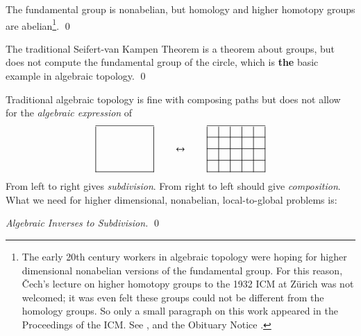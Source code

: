 \documentclass{elsarticle}
\begin{document}
\begin{anomaly}\label{thm:anom1} The fundamental group is nonabelian, but homology and higher homotopy groups are abelian\footnote{The early 20th century workers in algebraic topology were hoping for higher dimensional nonabelian versions of the fundamental group. For this reason,  \v Cech's lecture  on higher homotopy groups  to the 1932 ICM at Z\"urich was not welcomed;
it was even felt these groups  could not be different from the homology groups. So only a small paragraph on this work appeared in the Proceedings of the ICM. See  \cite{jam}, and the Obituary Notice \cite{Alex}. }. \qed
\end{anomaly}
\begin{anomaly}\label{thm:anom2}
 The traditional  Seifert-van Kampen Theorem is a theorem about groups, but does not compute the fundamental group of the circle, which is {\bf  the}  basic example in algebraic topology. \qed
\end{anomaly}


\begin{anomaly}\label{thm:anom3} Traditional algebraic topology is fine with composing paths  but does not allow for the {\it  algebraic expression} of
$$\vcenter{\xymatrix@M=0pt@=1pc{\ar @{-} [rrrrr] \ar @{-} [dddd]&&&&&\ar @{-} [dddd]\\&&&&&\\
&&&&&\\
&&&&&\\
\ar @{-} [rrrrr] &&&&&}}\qquad \leftrightarrow \qquad   \vcenter{\xymatrix@M=0pt@=1pc{\ar
@{-} [rrrrr] \ar @{-} [dddd]&\ar @{-} [dddd]&\ar @{-} [dddd]&\ar
@{-} [dddd]&\ar @{-} [dddd]&\ar @{-} [dddd]
\\\ar @{-} [rrrrr]&&&&&\\
\ar @{-} [rrrrr]&&&&&\\
\ar @{-} [rrrrr]&&&&&\\
\ar @{-} [rrrrr]&&&&&}}$$
 From left to right gives {\it subdivision}.
  From right to left should give {\it composition}.  What we need for higher dimensional, nonabelian,  local-to-global problems is:

\hspace{10em}   {\it Algebraic Inverses to Subdivision.}   \qed

\end{anomaly}
\end{document}

